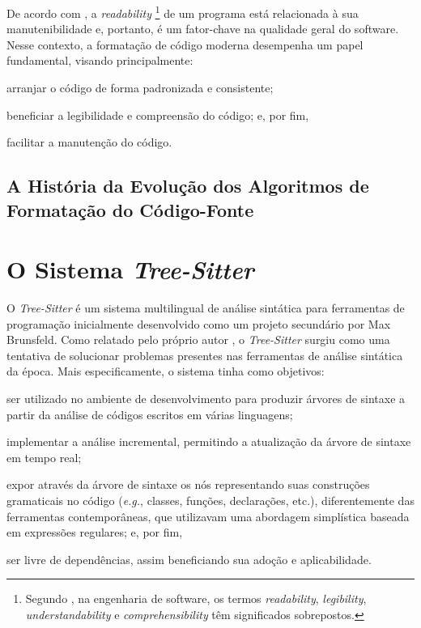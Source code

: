 \documentclass[11pt, a4paper, english, openright, twoside, brazil]{abntex2}
\begin{document}
  De acordo com \textcite[1]{buse-2009-learning}, a \textit{readability}%
  \footnote
    { Segundo \textcite{oliveira-2020-evaluating}, na engenharia de software,
      os termos \textit{readability}, \textit{legibility},
      \textit{understandability} e \textit{comprehensibility} têm significados
      sobrepostos.}
  de um programa está relacionada à sua manutenibilidade e, portanto, é um
  fator-chave na qualidade geral do software.
  Nesse contexto, a formatação de código moderna desempenha um papel
  fundamental, visando principalmente:
  \begin{inparaenum}
    \item arranjar o código de forma padronizada e consistente;
    \item beneficiar a legibilidade e compreensão do código; e, por fim,
    \item facilitar a manutenção do código.
  \end{inparaenum}

  \section{A História da Evolução dos Algoritmos de Formatação do Código-Fonte}


  \chapter{O Sistema \textit{Tree-Sitter}}

  O \textit{Tree-Sitter} é um sistema multilingual de análise sintática para
  ferramentas de programação inicialmente desenvolvido como um projeto
  secundário por Max Brunsfeld. Como relatado pelo próprio autor
  \cite{github-2017-tree}, o \textit{Tree-Sitter} surgiu como uma tentativa de
  solucionar problemas presentes nas ferramentas de análise sintática da época.
  Mais especificamente, o sistema tinha como objetivos:
  \begin{inparaenum}
    \item ser utilizado no ambiente de desenvolvimento para produzir árvores de
          sintaxe a partir da análise de códigos escritos em várias linguagens;
    \item implementar a análise incremental, permitindo a atualização da árvore
          de sintaxe em tempo real;
    \item expor através da árvore de sintaxe os nós representando suas
          construções gramaticais no código (\textit{e.g.}, classes, funções,
          declarações, etc.), diferentemente das ferramentas contemporâneas,
          que utilizavam uma abordagem simplística baseada em expressões
          regulares; e, por fim,
    \item ser livre de dependências, assim beneficiando sua adoção e
          aplicabilidade.
  \end{inparaenum}
\end{document}
